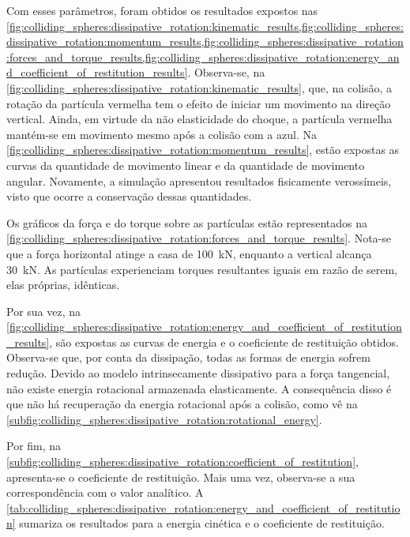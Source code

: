 Com esses parâmetros, foram obtidos os resultados expostos nas \cref{fig:colliding_spheres:dissipative_rotation:kinematic_results,fig:colliding_spheres:dissipative_rotation:momentum_results,fig:colliding_spheres:dissipative_rotation:forces_and_torque_results,fig:colliding_spheres:dissipative_rotation:energy_and_coefficient_of_restitution_results}. Observa-se, na \cref{fig:colliding_spheres:dissipative_rotation:kinematic_results}, que, na colisão, a rotação da partícula vermelha tem o efeito de iniciar um movimento na direção vertical. Ainda, em virtude da não elasticidade do choque, a partícula vermelha mantém-se em movimento mesmo após a colisão com a azul. Na \cref{fig:colliding_spheres:dissipative_rotation:momentum_results}, estão expostas as curvas da quantidade de movimento linear e da quantidade de movimento angular. Novamente, a simulação apresentou resultados fisicamente verossímeis, visto que ocorre a conservação dessas quantidades. 

Os gráficos da força e do torque sobre as partículas estão representados na \cref{fig:colliding_spheres:dissipative_rotation:forces_and_torque_results}. Nota-se que a força horizontal atinge a casa de \SI{100}{\kilo\newton}, enquanto a vertical alcança \SI{30}{\kilo\newton}. As partículas experienciam torques resultantes iguais em razão de serem, elas próprias, idênticas. 

Por sua vez, na \cref{fig:colliding_spheres:dissipative_rotation:energy_and_coefficient_of_restitution_results}, são expostas as curvas de energia e o coeficiente de restituição obtidos. Observa-se que, por conta da dissipação, todas as formas de energia sofrem redução. Devido ao modelo intrinsecamente dissipativo para a força tangencial, não existe energia rotacional armazenada elasticamente. A consequência disso é que não há recuperação da energia rotacional após a colisão, como vê na \cref{subfig:colliding_spheres:dissipative_rotation:rotational_energy}. 

Por fim, na \cref{subfig:colliding_spheres:dissipative_rotation:coefficient_of_restitution}, apresenta-se o coeficiente de restituição. Mais uma vez, observa-se a sua correspondência com o valor analítico. A \cref{tab:colliding_spheres:dissipative_rotation:energy_and_coefficient_of_restitution} sumariza os resultados para a energia cinética e o coeficiente de restituição.

